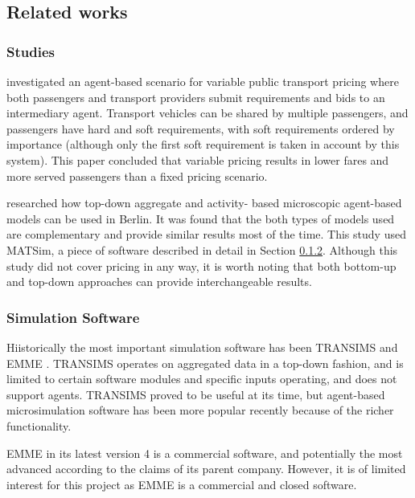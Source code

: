 \subsection{Related works}
\label{sec:literature:related}

\subsubsection{Studies}

\textcite{Emele2013pricing+rural} investigated an agent-based scenario for
variable public transport pricing where both passengers and transport providers
submit requirements and bids to an intermediary agent. Transport vehicles can
be shared by multiple passengers, and passengers have hard and soft
requirements, with soft requirements ordered by importance (although only the
first soft requirement is taken in account by this system). This paper
concluded that variable pricing results in lower fares and more served
passengers than a fixed pricing scenario.

\textcite{Neumann2011berlin} researched how top-down aggregate and activity-
based microscopic agent-based models can be used in Berlin. It was found that
the both types of models used are complementary and provide similar results
most of the time. This study used MATSim, a piece of software described in
detail in Section \ref{sec:literature:related:simulation}. Although this study
did not cover pricing in any way, it is worth noting that both bottom-up and
top-down approaches can provide interchangeable results.

\subsubsection{Simulation Software}
\label{sec:literature:related:simulation}

Hiistorically the most important simulation software has been TRANSIMS
\parencite{Smith1995taxi+transims} and EMME \parencite{Gao2010taxi+comparison}.
TRANSIMS operates on aggregated data in a top-down fashion, and is limited to
certain software modules and specific inputs operating, and does not support
agents. TRANSIMS proved to be useful at its time, but agent-based
microsimulation software has been more popular recently because of the richer functionality. \parencite{Bernhardt2007taxi+agent}

EMME in its latest version 4 is a commercial software, and potentially the most
advanced according to the claims of its parent company. However, it is of
limited interest for this project as EMME is a commercial and closed software.
\parencite{Inro2014emme}

